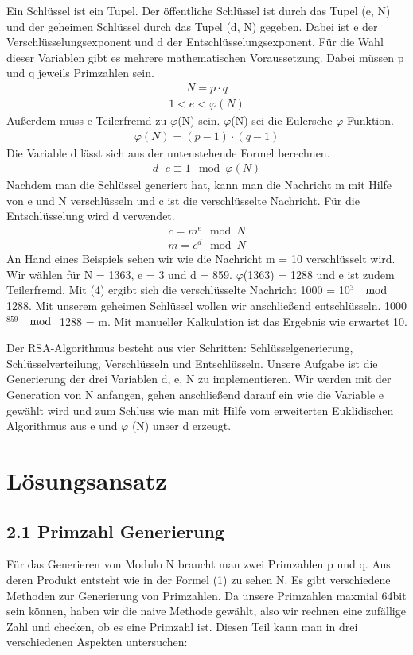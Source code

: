 \documentclass[course=asp]{aspdoc}
\begin{document}
Ein Schlüssel ist ein Tupel. Der öffentliche Schlüssel ist durch das Tupel (e, N) und der geheimen Schlüssel durch das Tupel (d, N) gegeben. Dabei ist e der Verschlüsselungsexponent und d der Entschlüsselungsexponent. Für die Wahl dieser Variablen gibt es mehrere mathematischen Voraussetzung. Dabei müssen p und q jeweils Primzahlen sein.
\begin{align}
 N = p \cdot q
\end{align}
\begin{align}
1 < e < \varphi (N)
\end{align}
Außerdem muss e Teilerfremd zu $\varphi $(N) sein. $\varphi $(N) sei die Eulersche $\varphi $-Funktion.
\begin{align}
\varphi (N) = (p - 1)\cdot(q - 1)
\end{align}
Die Variable d lässt sich aus der untenstehende Formel berechnen.
\begin{align}
d \cdot e \equiv 1 \mod \varphi (N)
\end{align}
Nachdem man die Schlüssel generiert hat, kann man die Nachricht m mit Hilfe von e und N verschlüsseln und c ist die verschlüsselte Nachricht. Für die Entschlüsselung wird d verwendet.
\begin{align}
c {=} m^e \mod N
\end{align} 
\begin{align}
m {=} c^d \mod N
\end{align} 
An Hand eines Beispiels sehen wir wie die Nachricht m = 10 verschlüsselt wird. Wir wählen für N = 1363, e = 3 und d = 859. $\varphi $(1363) = 1288 und e ist zudem Teilerfremd. Mit (4) ergibt sich die verschlüsselte Nachricht 1000 = 10$^{3}$ $\mod $ 1288. Mit unserem geheimen Schlüssel wollen wir anschließend entschlüsseln. 1000$^{859}$ $\mod $ 1288 = m. Mit manueller Kalkulation ist das Ergebnis wie erwartet 10.

Der RSA-Algorithmus besteht aus vier Schritten: Schlüsselgenerierung, Schlüsselverteilung, Verschlüsseln und Entschlüsseln. Unsere Aufgabe ist die Generierung der drei Variablen d, e, N zu implementieren. Wir werden mit der Generation von N anfangen, gehen anschließend darauf ein wie die Variable e gewählt wird und zum Schluss wie man mit Hilfe vom erweiterten Euklidischen Algorithmus aus e und $\varphi $ (N) unser d erzeugt.

\section{Lösungsansatz}  
\subsection*{2.1 Primzahl Generierung }
Für das Generieren von Modulo N braucht man zwei Primzahlen p und q. Aus deren Produkt entsteht wie in der Formel (1) zu sehen N. Es gibt verschiedene Methoden zur Generierung von Primzahlen. Da unsere Primzahlen maxmial 64bit sein können, haben wir die naive Methode gewählt, also wir rechnen eine zufällige Zahl und checken, ob es eine Primzahl ist. Diesen Teil kann man in drei verschiedenen Aspekten untersuchen:
\end{document}
